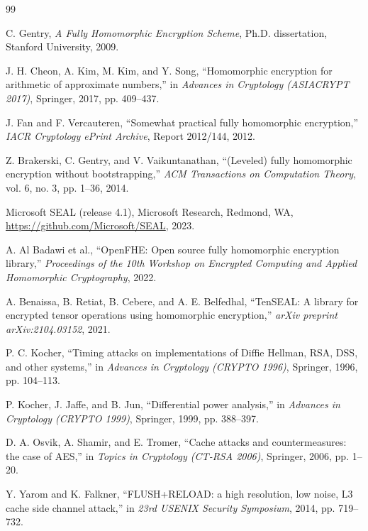 \documentclass[12pt,a4paper]{article}
\begin{document}
\clearpage
\begin{thebibliography}{99}

C. Gentry,
\textit{A Fully Homomorphic Encryption Scheme},
Ph.D. dissertation, Stanford University, 2009.

J. H. Cheon, A. Kim, M. Kim, and Y. Song,
``Homomorphic encryption for arithmetic of approximate numbers,''
in \textit{Advances in Cryptology (ASIACRYPT 2017)},
Springer, 2017, pp. 409--437.

J. Fan and F. Vercauteren,
``Somewhat practical fully homomorphic encryption,''
\textit{IACR Cryptology ePrint Archive}, Report 2012/144, 2012.

Z. Brakerski, C. Gentry, and V. Vaikuntanathan,
``(Leveled) fully homomorphic encryption without bootstrapping,''
\textit{ACM Transactions on Computation Theory}, vol. 6, no. 3, pp. 1--36, 2014.

Microsoft SEAL (release 4.1),
Microsoft Research, Redmond, WA,
\url{https://github.com/Microsoft/SEAL}, 2023.

A. Al Badawi et al.,
``OpenFHE: Open source fully homomorphic encryption library,''
\textit{Proceedings of the 10th Workshop on Encrypted Computing and Applied Homomorphic Cryptography}, 2022.

A. Benaissa, B. Retiat, B. Cebere, and A. E. Belfedhal,
``TenSEAL: A library for encrypted tensor operations using homomorphic encryption,''
\textit{arXiv preprint arXiv:2104.03152}, 2021.

P. C. Kocher,
``Timing attacks on implementations of Diffie Hellman, RSA, DSS, and other systems,''
in \textit{Advances in Cryptology (CRYPTO 1996)},
Springer, 1996, pp. 104--113.

P. Kocher, J. Jaffe, and B. Jun,
``Differential power analysis,''
in \textit{Advances in Cryptology (CRYPTO 1999)},
Springer, 1999, pp. 388--397.

D. A. Osvik, A. Shamir, and E. Tromer,
``Cache attacks and countermeasures: the case of AES,''
in \textit{Topics in Cryptology (CT-RSA 2006)},
Springer, 2006, pp. 1--20.

Y. Yarom and K. Falkner,
``FLUSH+RELOAD: a high resolution, low noise, L3 cache side channel attack,''
in \textit{23rd USENIX Security Symposium}, 2014, pp. 719--732.


\end{thebibliography}
\end{document}
